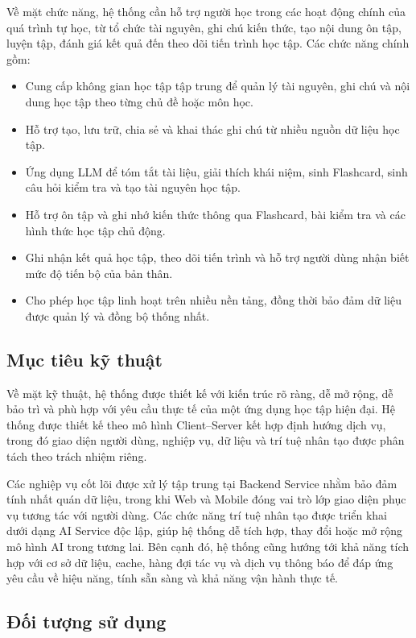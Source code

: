Về mặt chức năng, hệ thống cần hỗ trợ người học trong các hoạt động chính của quá trình tự học, từ tổ chức tài nguyên, ghi chú kiến thức, tạo nội dung ôn tập, luyện tập, đánh giá kết quả đến theo dõi tiến trình học tập. Các chức năng chính gồm:
\begin{itemize}
    \item Cung cấp không gian học tập tập trung để quản lý tài nguyên, ghi chú và nội dung học tập theo từng chủ đề hoặc môn học.
    \item Hỗ trợ tạo, lưu trữ, chia sẻ và khai thác ghi chú từ nhiều nguồn dữ liệu học tập.
    \item Ứng dụng LLM để tóm tắt tài liệu, giải thích khái niệm, sinh Flashcard, sinh câu hỏi kiểm tra và tạo tài nguyên học tập.
    \item Hỗ trợ ôn tập và ghi nhớ kiến thức thông qua Flashcard, bài kiểm tra và các hình thức học tập chủ động.
    \item Ghi nhận kết quả học tập, theo dõi tiến trình và hỗ trợ người dùng nhận biết mức độ tiến bộ của bản thân.
    \item Cho phép học tập linh hoạt trên nhiều nền tảng, đồng thời bảo đảm dữ liệu được quản lý và đồng bộ thống nhất.
\end{itemize}

\subsection{Mục tiêu kỹ thuật}

Về mặt kỹ thuật, hệ thống được thiết kế với kiến trúc rõ ràng, dễ mở rộng, dễ bảo trì và phù hợp với yêu cầu thực tế của một ứng dụng học tập hiện đại. Hệ thống được thiết kế theo mô hình Client--Server kết hợp định hướng dịch vụ, trong đó giao diện người dùng, nghiệp vụ, dữ liệu và trí tuệ nhân tạo được phân tách theo trách nhiệm riêng.

Các nghiệp vụ cốt lõi được xử lý tập trung tại Backend Service nhằm bảo đảm tính nhất quán dữ liệu, trong khi Web và Mobile đóng vai trò lớp giao diện phục vụ tương tác với người dùng. Các chức năng trí tuệ nhân tạo được triển khai dưới dạng AI Service độc lập, giúp hệ thống dễ tích hợp, thay đổi hoặc mở rộng mô hình AI trong tương lai. Bên cạnh đó, hệ thống cũng hướng tới khả năng tích hợp với cơ sở dữ liệu, cache, hàng đợi tác vụ và dịch vụ thông báo để đáp ứng yêu cầu về hiệu năng, tính sẵn sàng và khả năng vận hành thực tế.

\subsection{Đối tượng sử dụng}

